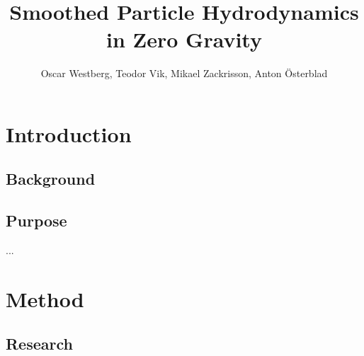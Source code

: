 \documentclass[a4paper,12pt,twoside]{report}
\begin{document}
\pagestyle{plain}


\title{Smoothed Particle Hydrodynamics in Zero Gravity}
\author{Oscar Westberg, Teodor Vik, Mikael Zackrisson, Anton Österblad}
\maketitle

\tableofcontents  %
\listoffigures    %
\listoftables     %



\chapter{Introduction}
\setcounter{page}{1}


\section{Background}




\section{Purpose}

...

\chapter{Method}


\section{Research}
\end{document}
